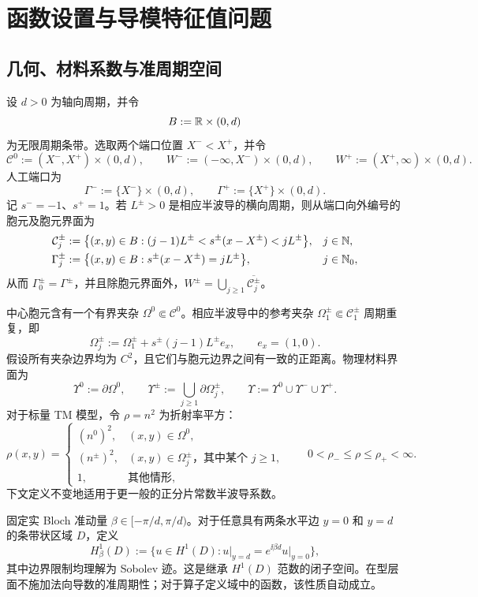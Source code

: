 \section{函数设置与导模特征值问题}
\label{sec:functional-setting}

\subsection{几何、材料系数与准周期空间}

设 $d>0$ 为轴向周期，并令
\[
  B:=\mathbb{R}\times(0,d)
\]
为无限周期条带。选取两个端口位置 $X^-<X^+$，并令
\[
  \mathcal C^0:=(X^-,X^+)\times(0,d),\qquad
  W^-:=(-\infty,X^-)\times(0,d),\qquad
  W^+:=(X^+,\infty)\times(0,d).
\]
人工端口为
\[
  \Gamma^-:=\{X^-\}\times(0,d),\qquad
  \Gamma^+:=\{X^+\}\times(0,d).
\]
记 $s^-=-1$、$s^+=1$。若 $L^\pm>0$ 是相应半波导的横向周期，则从端口向外编号的胞元及胞元界面为
\begin{align*}
  \mathcal C_j^\pm
  &:=\bigl\{(x,y)\in B:(j-1)L^\pm<s^\pm(x-X^\pm)<jL^\pm\bigr\},
  &&j\in\mathbb{N},\\
  \Gamma_j^\pm
  &:=\bigl\{(x,y)\in B:s^\pm(x-X^\pm)=jL^\pm\bigr\},
  &&j\in\mathbb{N}_0,
\end{align*}
从而 $\Gamma_0^\pm=\Gamma^\pm$，并且除胞元界面外，$W^\pm=\bigcup_{j\geq1}\overline{\mathcal C_j^\pm}$。

中心胞元含有一个有界夹杂 $\Omega^0\Subset\mathcal C^0$。相应半波导中的参考夹杂 $\Omega_1^\pm\Subset\mathcal C_1^\pm$ 周期重复，即
\[
  \Omega_j^\pm:=\Omega_1^\pm+s^\pm(j-1)L^\pm e_x,
  \qquad e_x=(1,0).
\]
假设所有夹杂边界均为 $C^2$，且它们与胞元边界之间有一致的正距离。物理材料界面为
\[
  \Upsilon^0:=\partial\Omega^0,\qquad
  \Upsilon^\pm:=\bigcup_{j\geq1}\partial\Omega_j^\pm,\qquad
  \Upsilon:=\Upsilon^0\cup\Upsilon^-\cup\Upsilon^+.
\]
对于标量 TM 模型，令 $\rho=n^2$ 为折射率平方：
\begin{equation}
  \rho(x,y)=
  \begin{cases}
    (n^0)^2,&(x,y)\in\Omega^0,\\
    (n^\pm)^2,&(x,y)\in\Omega_j^\pm\text{，其中某个 }j\geq1,\\
    1,&\text{其他情形},
  \end{cases}
  \qquad 0<\rho_-\leq \rho\leq \rho_+<\infty.
  \label{eq:material}
\end{equation}
下文定义不变地适用于更一般的正分片常数半波导系数。

固定实 Bloch 准动量 $\beta\in[-\pi/d,\pi/d)$。对于任意具有两条水平边 $y=0$ 和 $y=d$ 的条带状区域 $D$，定义
\begin{equation}
  H^1_\beta(D):=
  \bigl\{u\in H^1(D):
  \left.u\right|_{y=d}
  =e^{\ii\beta d}\left.u\right|_{y=0}\bigr\},
  \label{eq:H1beta}
\end{equation}
其中边界限制均理解为 Sobolev 迹。这是继承 $H^1(D)$ 范数的闭子空间。在型层面不施加法向导数的准周期性；对于算子定义域中的函数，该性质自动成立。

